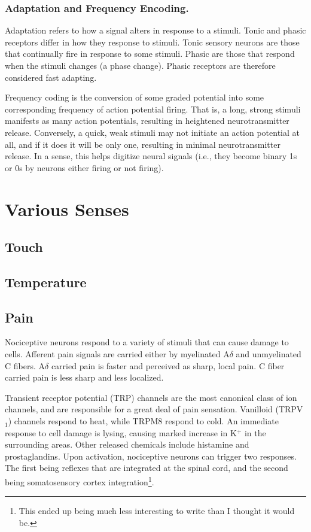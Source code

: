 \documentclass[12pt]{report}
\begin{document}
\subsubsection{Adaptation and Frequency Encoding.}

Adaptation refers to how a signal alters in response to a stimuli. Tonic and phasic receptors differ in how they response to stimuli. Tonic sensory neurons are those that continually fire in response to some stimuli. Phasic are those that respond when the stimuli changes (a phase change). Phasic receptors are therefore considered fast adapting.\newline

Frequency coding is the conversion of some graded potential into some corresponding frequency of action potential firing. That is, a long, strong stimuli manifests as many action potentials, resulting in heightened neurotransmitter release. Conversely, a quick, weak stimuli may not initiate an action potential at all, and if it does it will be only one, resulting in minimal neurotransmitter release. In a sense, this helps digitize neural signals (i.e., they become binary 1s or 0s by neurons either firing or not firing).

\section{Various Senses}

\subsection{Touch}

\subsection{Temperature}

\subsection{Pain}
Nociceptive neurons respond to a variety of stimuli that can cause damage to cells. Afferent pain signals are carried either by myelinated A$\delta$ and unmyelinated C fibers. A$\delta$ carried pain is faster and perceived as sharp, local pain. C fiber carried pain is less sharp and less localized.\newline

Transient receptor potential (TRP) channels are the most canonical class of ion channels, and are responsible for a great deal of pain sensation. Vanilloid (TRPV$_1$) channels respond to heat, while TRPM8 respond to cold. An immediate response to cell damage is lysing, causing marked increase in K$^+$ in the surrounding areas. Other released chemicals include histamine and prostaglandins. Upon activation, nociceptive neurons can trigger two responses. The first being reflexes that are integrated at the spinal cord, and the second being somatosensory cortex integration\footnote{This ended up being much less interesting to write than I thought it would be.}.\newline
\end{document}
